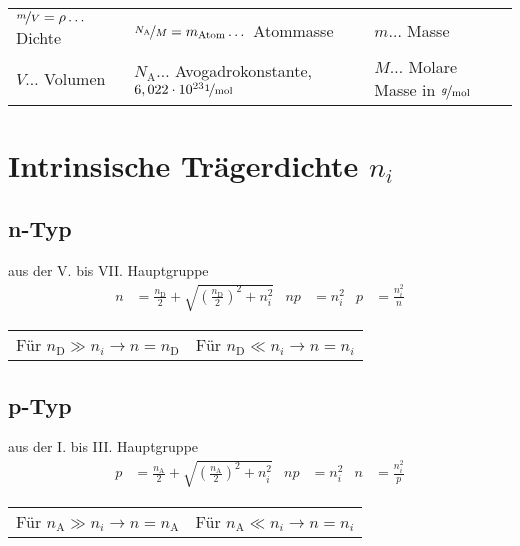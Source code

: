 		\begin{table}[h]
		\begin{tabular}{lll}
		$\nicefrac{m}{V}=\rho\dots$ Dichte & $\nicefrac{N_{\text{A}}}{M}=m_{\text{Atom}}\dots$ Atommasse & $m\dots$ Masse\\
		$V\dots$ Volumen & $N_{\text{A}}\dots$ Avogadrokonstante, $6,022\cdot10^{23}\nicefrac{1}{\mathrm{mol}}$ & $M\dots$ Molare Masse in $\nicefrac{g}{\mathrm{mol}}$\\
		\end{tabular}
		\end{table}

\clearpage

	\section{Intrinsische Trägerdichte $n_i$}
		\subsection{n-Typ}
		aus der V. bis VII. Hauptgruppe
			\begin{align*}
				n &= \frac{n_{\text{D}}}{2}+
				\sqrt{\left(\frac{n_{\text{D}}}{2}\right)^2+n_i^2} 
				& np &=n_i^2 & p &=\frac{n_i^2}{n}
			\end{align*}

			\begin{table}[h]
			\begin{tabular}{ll}
			Für $n_{\text{D}}\gg n_i \rightarrow n=n_{\text{D}}$ & Für $n_{\text{D}}\ll n_i \rightarrow n=n_i$\\
			\end{tabular}
			\end{table}

		\subsection{p-Typ}
		aus der I. bis III. Hauptgruppe
			\begin{align*}
				p &= \frac{n_{\text{A}}}{2}+
				\sqrt{\left(\frac{n_{\text{A}}}{2}\right)^2+n_i^2} 
				& np &= n_i^2 & n &= \frac{n_i^2}{p}
			\end{align*}

			\begin{table}[h]
			\begin{tabular}{ll}
			Für $n_{\text{A}}\gg n_i \rightarrow n=n_{\text{A}}$ & Für $n_{\text{A}}\ll n_i \rightarrow n=n_i$\\
			\end{tabular}
			\end{table}

